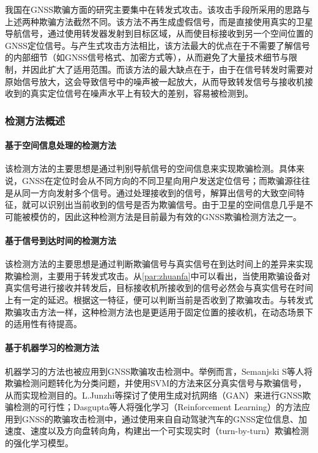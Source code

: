 我国在GNSS欺骗方面的研究主要集中在转发式攻击。该攻击手段所采用的思路与上述两种欺骗方法截然不同。该方法不再生成虚假信号，而是直接使用真实的卫星导航信号，通过使用转发器发射到目标区域，从而使目标接收到另一个空间位置的GNSS定位信号。与产生式攻击方法相比，该方法最大的优点在于不需要了解信号的内部细节（如GNSS信号格式、加密方式等），从而避免了大量技术细节与限制，并因此扩大了适用范围。而该方法的最大缺点在于，由于在信号转发时需要对原始信号放大，这会导致信号中的噪声被一起放大，从而导致转发信号与接收机接收到的真实定位信号在噪声水平上有较大的差别，容易被检测到。
\subsubsection{检测方法概述}
\paragraph{基于空间信息处理的检测方法}

该检测方法的主要思想是通过判别导航信号的空间信息来实现欺骗检测。具体来说，GNSS在定位时会从不同方向的不同卫星向用户发送定位信号；而欺骗源往往是从同一方向发射多个信号。通过处理接收到的信号，解算出信号的大致空间特征，就可以识别出当前收到的信号是否为欺骗信号。由于卫星的空间信息几乎是不可能被模仿的，因此这种检测方法是目前最为有效的GNSS欺骗检测方法之一。
\paragraph{基于信号到达时间的检测方法}

该检测方法的主要思想是通过判断欺骗信号与真实信号在到达时间上的差异来实现欺骗检测，主要用于转发式攻击。从\ref{par:zhuanfa}中可以看出，当使用欺骗设备对真实信号进行接收并转发后，目标接收机所接收到的信号必然会与真实信号在时间上有一定的延迟。根据这一特征，便可以判断当前是否收到了欺骗攻击。与转发式欺骗攻击方法一样，这种检测方法也是更适用于固定位置的接收机，在动态场景下的适用性有待提高。

\paragraph{基于机器学习的检测方法}
机器学习的方法也被应用到GNSS欺骗攻击检测中。举例而言，Semanjski S等人\cite{semanjski2020gnss}将欺骗检测问题转化为分类问题，并使用SVM的方法来区分真实信号与欺骗信号，从而实现检测目的。L.Junzhi等\cite{Junzhi2019gan}探讨了使用生成对抗网络（GAN）来进行GNSS欺骗检测的可行性；Dasgupta等人\cite{dasgupta2021reinforcement}将强化学习（Reinforcement Learning）的方法应用到GNSS的欺骗攻击检测中，通过使用来自自动驾驶汽车的GNSS定位信息、加速度、速度以及方向盘转向角，构建出一个可实现实时（turn-by-turn）欺骗检测的强化学习模型。


